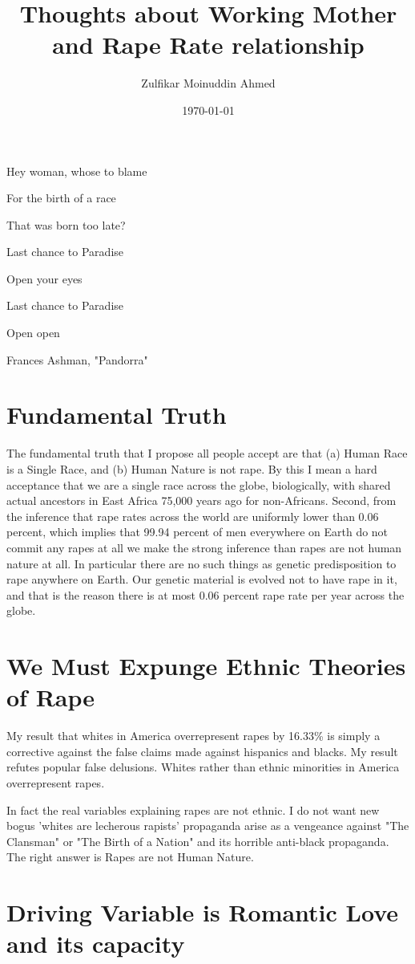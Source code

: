 \documentclass{amsart}
\title{Thoughts about Working Mother and Rape Rate relationship}
\author{Zulfikar Moinuddin Ahmed}
\date{\today}
\begin{document}
\maketitle
\epigraph{Hey woman, whose to blame

For the birth of a race

That was born too late?

Last chance to Paradise

Open your eyes

Last chance to Paradise

Open open}{Frances Ashman, "Pandorra"}

\section{Fundamental Truth}
The fundamental truth that I propose all people accept are that (a) Human Race is a Single Race, and (b) Human Nature is not rape.  By this I mean a hard acceptance that we are a single race across the globe, biologically, with shared actual ancestors in East Africa 75,000 years ago for non-Africans.  Second, from the inference that rape rates across the world are uniformly lower than 0.06 percent, which implies that 99.94 percent of men everywhere on Earth do not commit any rapes at all we make the strong inference than rapes are not human nature at all.  In particular there are no such things as genetic predisposition to rape anywhere on Earth.  Our genetic material is evolved not to have rape in it, and that is the reason there is at most 0.06 percent rape rate per year across the globe.  

\section{We Must Expunge Ethnic Theories of Rape}

My result that whites in America overrepresent rapes by 16.33\% is simply a corrective against the false claims made against hispanics and blacks.  My result refutes popular false delusions.  Whites rather than ethnic minorities in America overrepresent rapes.  

In fact the real variables explaining rapes are not ethnic.  I do not want new bogus 'whites are lecherous rapists' propaganda arise as a vengeance against "The Clansman" or "The Birth of a Nation" and its horrible anti-black propaganda.  The right answer is Rapes are not Human Nature.

\section{Driving Variable is Romantic Love and its capacity}
\end{document}
